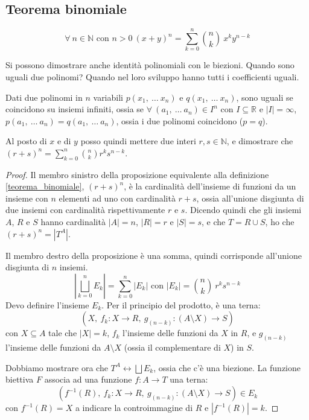 \subsection{Teorema binomiale}
\begin{prop}
\[
\forall \ n \in \mathbb{N} \text{ con } n > 0 \ 
(x + y)^n = 
\sum_{k = 0}^n \binom{n}{k} \ x^k y^{n - k}
\]
\end{prop}
Si possono dimostrare anche identit\`a polinomiali con le biezioni. Quando sono uguali due polinomi? Quando nel loro sviluppo hanno tutti i coefficienti uguali.
\begin{theorem}
Dati due polinomi in $n$ variabili $p(x_1, \ \dots \ x_n)$ e $q(x_1, \ \dots \ x_n)$, sono uguali se coincidono su insiemi infiniti, ossia se $\forall \ (a_1, \ \dots \ a_n) \in I^n$ con $I \subseteq \mathbb{R} $ e $ |I| = \infty$, $p(a_1, \ \dots \ a_n) = q(a_1, \ \dots \ a_n)$, ossia i due polinomi coincidono ($p = q$).
\end{theorem}
Al posto di $x$ e di $y$ posso quindi mettere due interi $r, s \in \mathbb{N}$, e dimostrare che $(r + s)^n = \sum_{k = 0}^n \binom{n}{k} r^k s^{n - k}$.
\begin{proof}
Il membro sinistro della proposizione equivalente alla definizione \ref{teorema_binomiale}, $(r + s)^n$, \`e la cardinalit\`a dell'insieme di funzioni da un insieme con $n$ elementi ad uno con cardinalit\`a $r + s$, ossia all'unione disgiunta di due insiemi con cardinalit\`a rispettivamente $r$ e $s$. Dicendo quindi che gli insiemi $A$, $R$ e $S$ hanno cardinalit\`a $|A| = n$, $|R| = r $ e $|S| = s$, e che $T = R \cup S$, ho che $(r + s)^n = \left| T^A \right|$.

Il membro destro della proposizione \`e una somma, quindi corrisponde all'unione disgiunta di $n$ insiemi.
\[
\left| \bigsqcup_{k = 0}^{n} E_k \right| = \sum_{k = 0}^{n} \left| E_k \right|
\text{ con }
|E_k| = \binom{n}{k} \ r^k s^{n - k}
\]
Devo definire l'insieme $E_k$. Per il principio del prodotto, \`e una terna:
\[
\left( X, \ f_k : X \to R, \ g_{(n - k)} : (A \setminus X) \to S \right)
\]
con $X \subseteq A$ tale che $|X| = k$, $f_k$ l'insieme delle funzioni da $X$ in $R$, e $g_{(n-k)}$ l'insieme delle funzioni da $A \setminus X$ (ossia il complementare di $X$) in $S$.

Dobbiamo mostrare ora che $T^A \leftrightarrow \bigsqcup E_k$, ossia che c'\`e una biezione. La funzione biettiva $F$ associa ad una funzione $f : A \to T$ una terna:
\[
\left( f^{-1} (R), \ f_k : X \to R, \ g_{(n - k)} : (A \setminus X) \to S \right) \in E_k
\]
con $f^{-1}(R) = X$ a indicare la controimmagine di $R$ e $|f^{-1}(R)| = k$.
\end{proof}

